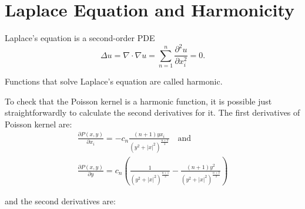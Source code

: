 \section{Laplace Equation and Harmonicity}

\begin{definition}
    Laplace's equation is a second-order PDE
    \begin{equation*}
        \Delta u=\nabla\cdot\nabla u=\sum_{n=1}^n\frac{\partial^2u}{\partial x_i^2}=0.
    \end{equation*}
\end{definition}

\begin{definition}
    Functions that solve Laplace's equation are called harmonic.
\end{definition}

To check that the Poisson kernel is a harmonic function, it is possible just straightforwardly to calculate the second derivatives for it. The first derivatives of Poisson kernel are:
\begin{gather*}
    \frac{\partial P(x,y)}{\partial x_i}=-c_n\frac{(n+1)yx_i}{(y^2+|x|^2)^{\frac{n+3}{2}}}\quad\text{and}\\
    \frac{\partial P(x,y)}{\partial y}=c_n\left(\frac{1}{(y^2+|x|^2)^{\frac{n+1}{2}}}-\frac{(n+1)y^2}{(y^2+|x|^2)^{\frac{n+3}{2}}}\right)
\end{gather*}

\noindent and the second derivatives are:

